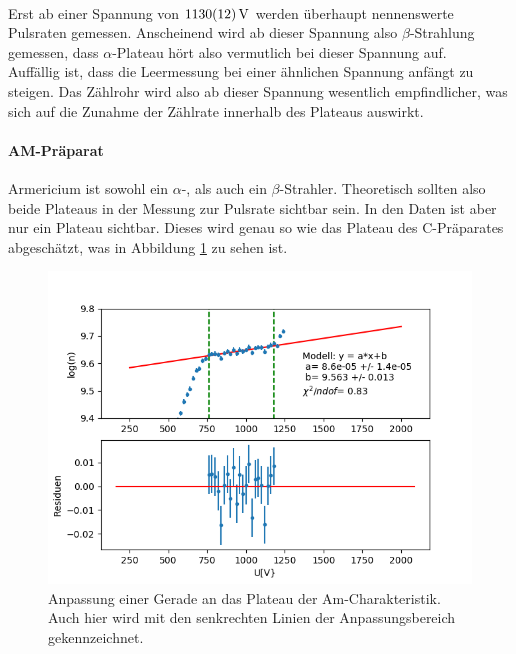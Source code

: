 \documentclass[12pt,a4paper]{article}
\begin{document}
\\
Erst ab einer Spannung von $\SI{1130\pm 12}{V}$ werden überhaupt nennenswerte Pulsraten gemessen. Anscheinend wird ab dieser Spannung also $\beta$-Strahlung gemessen, dass $\alpha$-Plateau hört also vermutlich bei dieser Spannung auf.\\
Auffällig ist, dass die Leermessung bei einer ähnlichen Spannung anfängt zu steigen. Das Zählrohr wird also ab dieser Spannung wesentlich empfindlicher, was sich auf die Zunahme der Zählrate innerhalb des Plateaus auswirkt.

\paragraph{AM-Präparat}
Armericium ist sowohl ein $\alpha$-, als auch ein $\beta$-Strahler. Theoretisch sollten also beide Plateaus in der Messung zur Pulsrate sichtbar sein. In den Daten ist aber nur ein Plateau sichtbar. Dieses wird genau so wie das Plateau des C-Präparates abgeschätzt, was in Abbildung \ref{fig:AMPlateau} zu sehen ist.

\begin{figure}
\centering
\includegraphics[scale=0.8]{Bilder/Prop/Am_plateau.PNG}
\caption{Anpassung einer Gerade an das Plateau der Am-Charakteristik. Auch hier wird mit den senkrechten Linien der Anpassungsbereich gekennzeichnet.}
\label{fig:AMPlateau}
\end{figure}
\end{document}
